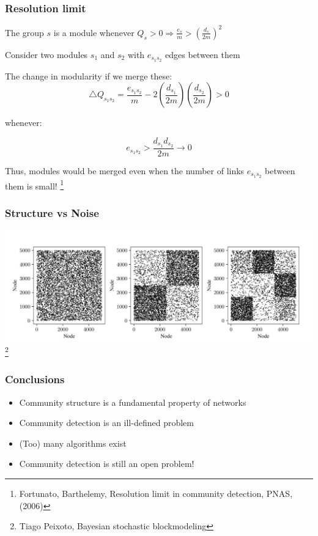 \documentclass{beamer}
\begin{document}
\begin{frame}
    \frametitle{Resolution limit}
    The group $s$ is a module whenever $Q_s > 0 \Rightarrow \frac{e_s}{m}>\left(\frac{d_s}{2m}\right)^2$

    \vspace{2em} 
    \justifying
    Consider two modules $s_1$ and $s_2$ with $e_{s_1s_2}$ edges between them

    The change in modularity if we merge these:
    $$\triangle Q_{s_1s_2} = \frac{e_{s_1s_2}}{m}-2\left(\frac{d_{s_1}}{2m}\right)\left(\frac{d_{s_2}}{2m}\right)>0$$

    whenever:

    $$e_{s_1s_2} > \frac{d_{s_1}d_{s_2}}{2m}\rightarrow 0$$

    Thus, modules would be merged even when the number of links $e_{s_1s_2}$ between them is small!
\footnote{Fortunato, Barthelemy, Resolution limit in community detection, PNAS, (2006)}
\end{frame}
\begin{frame}
    \frametitle{Structure vs Noise}
    \centering
    \includegraphics[width=\columnwidth]{three_adjacency.png}
\footnote{Tiago Peixoto, Bayesian stochastic blockmodeling}
\end{frame}
\begin{frame}
    \frametitle{Conclusions}
    \centering
    \begin{itemize}
    \setlength\itemsep{1em}
        \item{Community structure is a fundamental property of networks}
        \item{Community detection is an ill-defined problem}
        \item{(Too) many algorithms exist}
        \item{Community detection is still an open problem!}
    \end{itemize}
\end{frame}
\end{document}
